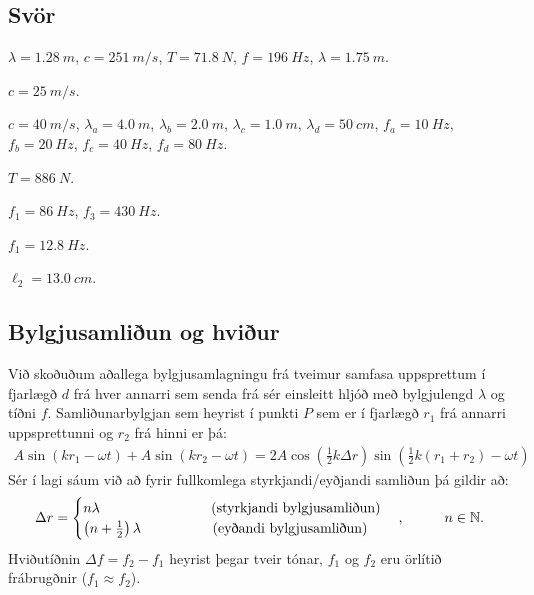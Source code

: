 \ifdefined \wholebook \else\documentclass[oneside]{book}\usepackage{EdlBook}\graphicspath{{figures/}}
\begin{document}
\subsection*{Svör}

\begin{enumerate*}[label = \vspace{0.15cm} \textbf{(\arabic*)}]
    \setcounter{enumi}{28}
  \item $\lambda = \SI{1.28}{m}$, $c = \SI{251}{m/s}$, $T = \SI{71.8}{N}$, $f = \SI{196}{Hz} $, $\lambda = \SI{1.75}{m}$.
  \item $c = \SI{25}{m/s}$.
  \item $c = \SI{40}{m/s}$, $\lambda_a = \SI{4.0}{m}$, $\lambda_b = \SI{2.0}{m}$, $\lambda_c = \SI{1.0}{m}$, $\lambda_d = \SI{50}{cm}$, $f_a = \SI{10}{Hz}$, $f_b = \SI{20}{Hz}$, $f_c = \SI{40}{Hz}$, $f_d = \SI{80}{Hz}$.
  \item $T = \SI{886}{N}$.
  \item $f_1 = \SI{86}{Hz}$, $f_3 = \SI{430}{Hz}$.
  \item $f_1 = \SI{12.8}{Hz}$.
  \item $\ell_2 = \SI{13.0}{cm}$.
\end{enumerate*}

\newpage


\subsection*{Bylgjusamliðun og hviður}

\begin{tcolorbox}
Við skoðuðum aðallega bylgjusamlagningu frá tveimur samfasa uppsprettum í fjarlægð $d$ frá hver annarri sem senda frá sér einsleitt hljóð með bylgjulengd $\lambda$ og tíðni $f$. Samliðunarbylgjan sem heyrist í punkti $P$ sem er í fjarlægð $r_1$ frá annarri uppsprettunni og $r_2$ frá hinni er þá:
\begin{align*}
    A\sin(kr_1-\omega t) + A\sin(kr_2 - \omega t) = 2A\cos(\frac{1}{2}k\Delta r)\sin(\frac{1}{2}k(r_1+r_2)-\omega t)
\end{align*}
Sér í lagi sáum við að fyrir fullkomlega styrkjandi/eyðjandi samliðun þá gildir að:
\begin{align*}
    \Delta r = \begin{cases}
    n \lambda \hspace{2.8cm} \text{(styrkjandi bylgjusamliðun)} \\
    \left(n+\frac{1}{2}\right)\lambda \hspace{1.8cm} \text{(eyðandi bylgjusamliðun)}
    \end{cases},\hspace{1cm} n \in \mathbb{N}.
\end{align*}
Hviðutíðnin $\Delta f = f_2 - f_1$ heyrist þegar tveir tónar, $f_1$ og $f_2$ eru örlítið frábrugðnir ($f_1 \approx f_2$).
\end{tcolorbox}
\end{document}
